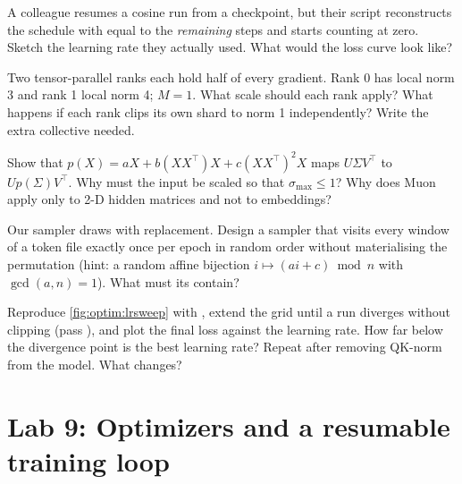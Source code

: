 \begin{exercise}
A colleague resumes a cosine run from a checkpoint, but their script reconstructs the schedule
with  equal to the \emph{remaining} steps and starts counting at zero. Sketch the
learning rate they actually used. What would the loss curve look like?
\end{exercise}

\begin{exercise}
Two tensor-parallel ranks each hold half of every gradient. Rank 0 has local norm 3 and rank 1
local norm 4; $M=1$. What scale should each rank apply? What happens if each rank clips its
own shard to norm 1 independently? Write the extra collective needed.
\end{exercise}

\begin{exercise}
Show that $p(X)=aX+b(XX^\top)X+c(XX^\top)^2X$ maps $U\Sigma V^\top$ to $Up(\Sigma)V^\top$. Why must
the input be scaled so that $\sigma_{\max}\le1$? Why does Muon apply only to 2-D hidden matrices
and not to embeddings?
\end{exercise}

\begin{exercise}
Our sampler draws with replacement. Design a sampler that visits every window of a token file
exactly once per epoch in random order without materialising the permutation (hint: a random
affine bijection $i\mapsto (ai+c)\bmod n$ with $\gcd(a,n)=1$). What must its 
contain?
\end{exercise}

\begin{exercise}
Reproduce \cref{fig:optim:lrsweep} with , extend the grid until a run
diverges without clipping (pass ), and plot the final loss against the
learning rate. How far below the divergence point is the best learning rate? Repeat after
removing QK-norm from the model. What changes?
\end{exercise}

\section{Lab 9: Optimizers and a resumable training loop}\label{sec:optim:lab}

